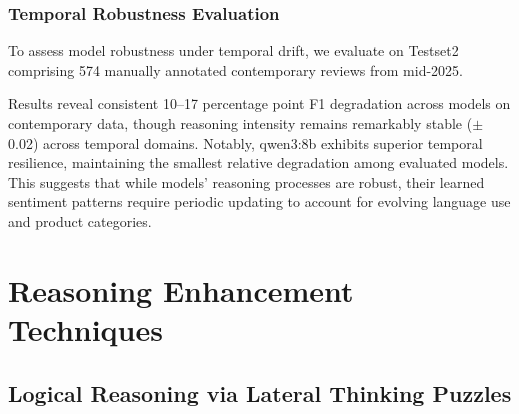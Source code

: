 \subsubsection{Temporal Robustness Evaluation}

To assess model robustness under temporal drift, we evaluate on Testset2 comprising 574 manually annotated contemporary reviews from mid-2025.

\begin{table}[htbp]
\centering
\caption{Cross-Platform Temporal Robustness: Original vs. Contemporary Reviews}
\label{tab:temporal_robustness}
\end{table}

Results reveal consistent 10--17 percentage point F1 degradation across models on contemporary data, though reasoning intensity remains remarkably stable ($\pm$0.02) across temporal domains. Notably, qwen3:8b exhibits superior temporal resilience, maintaining the smallest relative degradation among evaluated models. This suggests that while models' reasoning processes are robust, their learned sentiment patterns require periodic updating to account for evolving language use and product categories.

\section{Reasoning Enhancement Techniques}
\label{sec:reasoning_enhancement}

\subsection{Logical Reasoning via Lateral Thinking Puzzles}
\label{subsec:turtle_soup}

